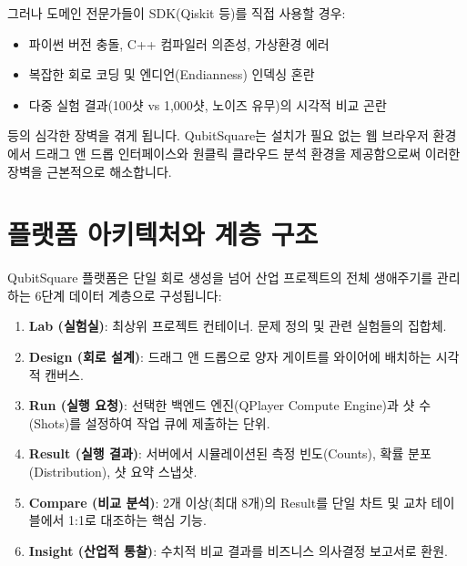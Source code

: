 \documentclass[11pt, a4paper]{article}
\theoremstyle{definition}
\begin{document}
그러나 도메인 전문가들이 SDK(Qiskit 등)를 직접 사용할 경우:
\begin{itemize}
    \item 파이썬 버전 충돌, C++ 컴파일러 의존성, 가상환경 에러
    \item 복잡한 회로 코딩 및 엔디언(Endianness) 인덱싱 혼란
    \item 다중 실험 결과(100샷 vs 1,000샷, 노이즈 유무)의 시각적 비교 곤란
\end{itemize}
등의 심각한 장벽을 겪게 됩니다. QubitSquare는 설치가 필요 없는 웹 브라우저 환경에서 드래그 앤 드롭 인터페이스와 원클릭 클라우드 분석 환경을 제공함으로써 이러한 장벽을 근본적으로 해소합니다.

\section{플랫폼 아키텍처와 계층 구조}
QubitSquare 플랫폼은 단일 회로 생성을 넘어 산업 프로젝트의 전체 생애주기를 관리하는 6단계 데이터 계층으로 구성됩니다:

\begin{enumerate}
    \item \textbf{Lab (실험실)}: 최상위 프로젝트 컨테이너. 문제 정의 및 관련 실험들의 집합체.
    \item \textbf{Design (회로 설계)}: 드래그 앤 드롭으로 양자 게이트를 와이어에 배치하는 시각적 캔버스.
    \item \textbf{Run (실행 요청)}: 선택한 백엔드 엔진(QPlayer Compute Engine)과 샷 수(Shots)를 설정하여 작업 큐에 제출하는 단위.
    \item \textbf{Result (실행 결과)}: 서버에서 시뮬레이션된 측정 빈도(Counts), 확률 분포(Distribution), 샷 요약 스냅샷.
    \item \textbf{Compare (비교 분석)}: 2개 이상(최대 8개)의 Result를 단일 차트 및 교차 테이블에서 1:1로 대조하는 핵심 기능.
    \item \textbf{Insight (산업적 통찰)}: 수치적 비교 결과를 비즈니스 의사결정 보고서로 환원.
\end{enumerate}

\end{document}
